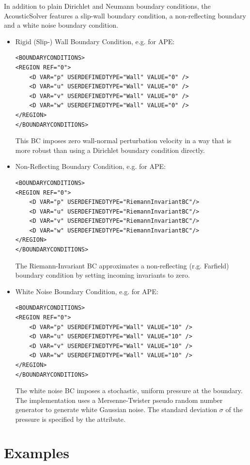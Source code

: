 In addition to plain Dirichlet and Neumann boundary conditions, the AcousticSolver features a slip-wall boundary condition, a non-reflecting boundary and a white noise boundary condition.
\begin{itemize}
\item Rigid (Slip-) Wall Boundary Condition, e.g. for APE:
\begin{lstlisting}[style=XmlStyle]
<BOUNDARYCONDITIONS>
<REGION REF="0">
    <D VAR="p" USERDEFINEDTYPE="Wall" VALUE="0" />
    <D VAR="u" USERDEFINEDTYPE="Wall" VALUE="0" />
    <D VAR="v" USERDEFINEDTYPE="Wall" VALUE="0" />
    <D VAR="w" USERDEFINEDTYPE="Wall" VALUE="0" />
</REGION>
</BOUNDARYCONDITIONS>
\end{lstlisting}
This BC imposes zero wall-normal perturbation velocity in a way that is more robust than using a Dirichlet boundary condition directly.

\item Non-Reflecting Boundary Condition, e.g. for APE:
\begin{lstlisting}[style=XmlStyle]
<BOUNDARYCONDITIONS>
<REGION REF="0">
    <D VAR="p" USERDEFINEDTYPE="RiemannInvariantBC"/>
    <D VAR="u" USERDEFINEDTYPE="RiemannInvariantBC"/>
    <D VAR="v" USERDEFINEDTYPE="RiemannInvariantBC"/>
    <D VAR="w" USERDEFINEDTYPE="RiemannInvariantBC"/>
</REGION>
</BOUNDARYCONDITIONS>
\end{lstlisting}
The Riemann-Invariant BC approximates a non-reflecting (r.g. Farfield)  boundary condition by setting incoming invariants to zero.

\item White Noise Boundary Condition, e.g. for APE:
\begin{lstlisting}[style=XmlStyle]
<BOUNDARYCONDITIONS>
<REGION REF="0">
    <D VAR="p" USERDEFINEDTYPE="Wall" VALUE="10" />
    <D VAR="u" USERDEFINEDTYPE="Wall" VALUE="10" />
    <D VAR="v" USERDEFINEDTYPE="Wall" VALUE="10" />
    <D VAR="w" USERDEFINEDTYPE="Wall" VALUE="10" />
</REGION>
</BOUNDARYCONDITIONS>
\end{lstlisting}
The white noise BC imposes a stochastic, uniform pressure at the boundary. The implementation uses a Mersenne-Twister pseudo random number generator to generate white Gaussian noise.
The standard deviation $\sigma$ of the pressure  is specified by the  attribute.

\end{itemize}


\section{Examples}
